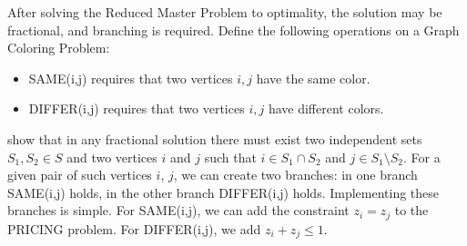 \documentclass[a4paper]{article}
\begin{document}
After solving the Reduced Master Problem to optimality, the solution may be fractional, and branching is required. Define the following operations on a Graph Coloring Problem:
\begin{itemize}
 \item SAME(i,j) requires that two vertices $i,j$ have the same color.
 \item DIFFER(i,j) requires that two vertices $i,j$ have different colors.
\end{itemize}
\citet{METR95} show that in any fractional solution there must exist two independent sets $S_1,S_2 \in S$ and two vertices $i$ and $j$ such that $i\in S_1 \cap S_2$ and $j\in S_1 \setminus S_2$. For a given pair of such vertices $i$, $j$, we can create two branches: in one branch SAME(i,j) holds, in the other branch DIFFER(i,j) holds. Implementing these branches is simple. For SAME(i,j), we can add the constraint $z_i=z_j$ to the PRICING problem. For DIFFER(i,j), we add $z_i+z_j\leq 1$. 
\end{document}
